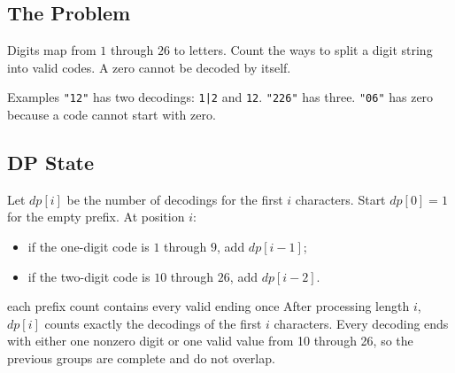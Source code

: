 
\subsection{The Problem}
Digits map from \(1\) through \(26\) to letters. Count the ways to split a digit
string into valid codes. A zero cannot be decoded by itself.

\begin{conceptbox}{Examples}
\texttt{"12"} has two decodings: \texttt{1|2} and \texttt{12}.
\texttt{"226"} has three. \texttt{"06"} has zero because a code cannot start
with zero.
\end{conceptbox}

\subsection{DP State}
Let \(dp[i]\) be the number of decodings for the first \(i\) characters.
Start \(dp[0]=1\) for the empty prefix. At position \(i\):
\begin{itemize}
  \item if the one-digit code is \(1\) through \(9\), add \(dp[i-1]\);
  \item if the two-digit code is \(10\) through \(26\), add \(dp[i-2]\).
\end{itemize}

\begin{invariantbox}{each prefix count contains every valid ending once}
After processing length \(i\), \(dp[i]\) counts exactly the decodings of the
first \(i\) characters. Every decoding ends with either one nonzero digit or
one valid value from 10 through 26, so the previous groups are complete
and do not overlap.
\end{invariantbox}

